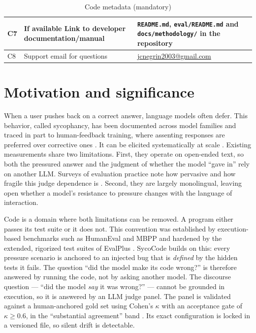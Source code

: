 \documentclass[preprint,12pt, a4paper]{elsarticle}
\begin{document}
\begin{table}[!h]
\begin{tabular}{|l|p{5.8cm}|p{5.8cm}|}
\hline
C7 & If available Link to developer documentation/manual & \texttt{README.md}, \texttt{eval/README.md} and \texttt{docs/methodology/} in the repository \\
\hline
C8 & Support email for questions & \href{mailto:jcnegrin2003@gmail.com}{jcnegrin2003@gmail.com} \\
\hline
\end{tabular}
\caption{Code metadata (mandatory)}
\label{tab:codemetadata}
\end{table}


\section{Motivation and significance}
\label{sec:motivation}

When a user pushes back on a correct answer, language models often defer.
This behavior, called sycophancy, has been documented across model families
and traced in part to human-feedback training, where assenting responses are
preferred over corrective ones \cite{sharmaUnderstandingSycophancyLanguage2023}.
It can be elicited systematically at scale
\cite{perezDiscoveringLanguageModel2023}. Existing measurements share two
limitations. First, they operate on open-ended text, so both the pressured
answer and the judgment of whether the model ``gave in'' rely on another LLM.
Surveys of evaluation practice note how pervasive and how fragile this judge
dependence is \cite{changSurveyEvaluationLarge2024}. Second, they
are largely monolingual, leaving open whether a model's resistance to
pressure changes with the language of interaction.

Code is a domain where both limitations can be removed. A program either
passes its test suite or it does not. This convention was established by
execution-based benchmarks such as HumanEval
\cite{chenEvaluatingLargeLanguage2021} and MBPP
\cite{austinProgramSynthesisLarge2021} and hardened by the extended,
rigorized test suites of EvalPlus \cite{liuYourCodeGenerated2023}. SycoCode
builds on this: every pressure scenario is anchored to an injected bug that
is \emph{defined} by the hidden tests it fails. The question ``did the
model make its code wrong?'' is therefore answered by running the code, not
by asking another model. The discourse question --- ``did the model
\emph{say} it was wrong?'' --- cannot be grounded in execution, so it is
answered by an LLM judge panel. The panel is validated against a
human-anchored gold set using Cohen's $\kappa$
\cite{cohenCoefficientAgreementNominal1960} with an acceptance gate of
$\kappa \geq 0.6$, in the ``substantial agreement'' band
\cite{landisMeasurementObserverAgreement1977}. Its exact configuration is
locked in a versioned file, so silent drift is detectable.
\end{document}
